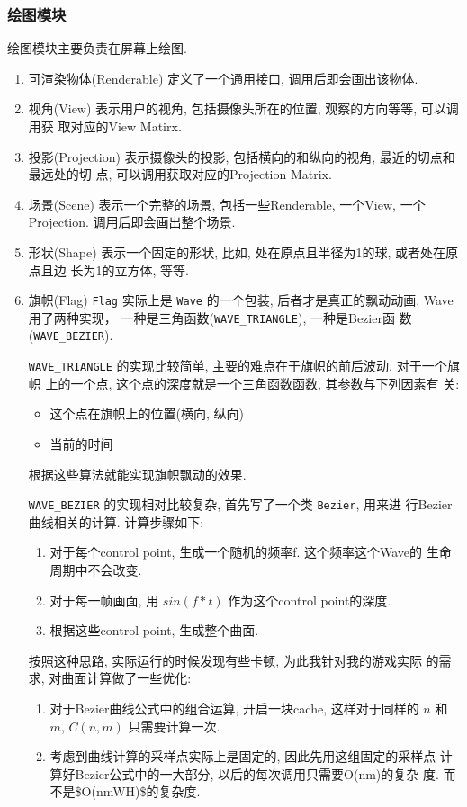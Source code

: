 \documentclass[11pt]{article}
\begin{document}
\subsubsection{绘图模块}
\label{sec-3-2-2}
绘图模块主要负责在屏幕上绘图.
\begin{enumerate}
\item 可渲染物体(Renderable)
\label{sec-3-2-2-1}
定义了一个通用接口, 调用后即会画出该物体. 
\item 视角(View)
\label{sec-3-2-2-2}
表示用户的视角, 包括摄像头所在的位置, 观察的方向等等, 可以调用获
取对应的View Matirx.
\item 投影(Projection)
\label{sec-3-2-2-3}
表示摄像头的投影, 包括横向的和纵向的视角, 最近的切点和最远处的切
点, 可以调用获取对应的Projection Matrix.
\item 场景(Scene)
\label{sec-3-2-2-4}
表示一个完整的场景, 包括一些Renderable, 一个View, 一个Projection.
调用后即会画出整个场景.
\item 形状(Shape)
\label{sec-3-2-2-5}
表示一个固定的形状, 比如, 处在原点且半径为1的球, 或者处在原点且边
长为1的立方体, 等等. 
\item 旗帜(Flag)
\label{sec-3-2-2-6}
\texttt{Flag} 实际上是 \texttt{Wave} 的一个包装, 后者才是真正的飘动动画.
Wave用了两种实现， 一种是三角函数(\texttt{WAVE\_TRIANGLE}), 一种是Bezier函
数(\texttt{WAVE\_BEZIER}). 

\texttt{WAVE\_TRIANGLE} 的实现比较简单, 主要的难点在于旗帜的前后波动. 对于一个旗帜
上的一个点, 这个点的深度就是一个三角函数函数, 其参数与下列因素有
关:
\begin{itemize}
\item 这个点在旗帜上的位置(横向, 纵向)
\item 当前的时间
\end{itemize}

根据这些算法就能实现旗帜飘动的效果. 

\texttt{WAVE\_BEZIER} 的实现相对比较复杂, 首先写了一个类 \texttt{Bezier}, 用来进
行Bezier曲线相关的计算. 计算步骤如下:
\begin{enumerate}
\item 对于每个control point, 生成一个随机的频率f. 这个频率这个Wave的
生命周期中不会改变.
\item 对于每一帧画面, 用 $sin(f*t)$ 作为这个control point的深度.
\item 根据这些control point, 生成整个曲面.
\end{enumerate}

按照这种思路, 实际运行的时候发现有些卡顿, 为此我针对我的游戏实际
的需求, 对曲面计算做了一些优化:
\begin{enumerate}
\item 对于Bezier曲线公式中的组合运算, 开启一块cache, 这样对于同样的
$n$ 和 $m$, $C(n, m)$ 只需要计算一次.
\item 考虑到曲线计算的采样点实际上是固定的, 因此先用这组固定的采样点
计算好Bezier公式中的一大部分, 以后的每次调用只需要O(nm)的复杂
度. 而不是\$O(nmWH)\$的复杂度.
\end{enumerate}


\end{enumerate}
\end{document}
